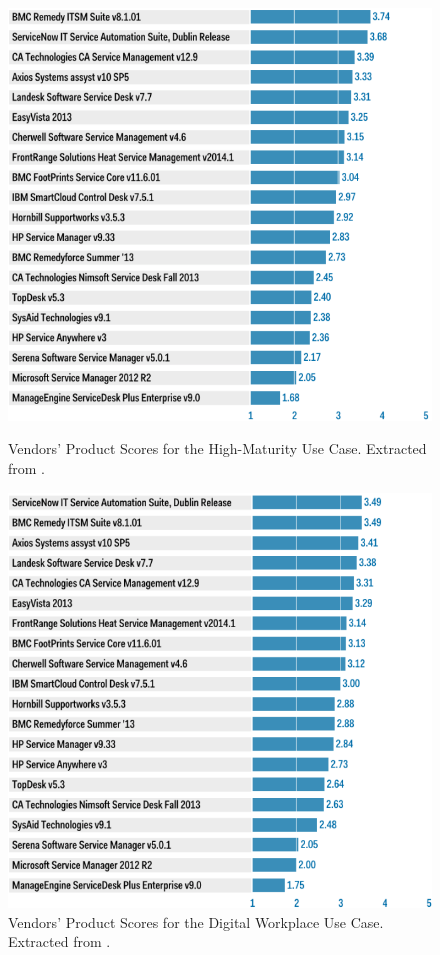 \begin{figure}[!h]
\begin{minipage}[h]{0.42\linewidth}
\centering
\includegraphics[width=\textwidth]{img/HighScores.png}
\caption{Vendors' Product Scores for the High-Maturity Use Case. Extracted from \cite{criticalCapabilitiesITSM}.}
\label{fig:figure1}
\end{minipage}
\hspace{0.5cm}
\begin{minipage}[!h]{0.42\linewidth}
\centering
\includegraphics[width=\textwidth]{img/DigitalWorkplaceScores.png}
\caption{Vendors' Product Scores for the Digital Workplace Use Case. Extracted from \cite{criticalCapabilitiesITSM}.}
\label{fig:figure2}
\end{minipage}
\end{figure}


